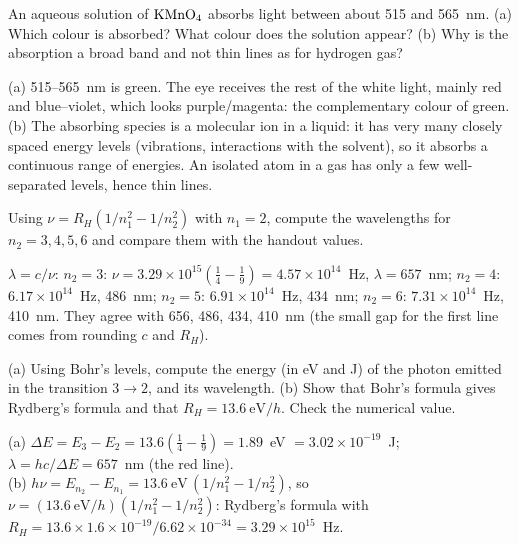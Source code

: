 An aqueous solution of $\ce{KMnO4}$ absorbs light between about 515 and 565~nm.
(a) Which colour is absorbed? What colour does the solution appear? (b) Why is the absorption a
broad band and not thin lines as for hydrogen gas?
\begin{solution}
(a) 515--565~nm is green. The eye receives the rest of the white light, mainly red and blue--violet,
which looks purple/magenta: the complementary colour of green.\\
(b) The absorbing species is a molecular ion in a liquid: it has very many closely spaced energy levels
(vibrations, interactions with the solvent), so it absorbs a continuous range of energies. An
isolated atom in a gas has only a few well-separated levels, hence thin lines.
\end{solution}

Using $\nu = R_H(1/n_1^2 - 1/n_2^2)$ with $n_1 = 2$, compute the wavelengths for $n_2 = 3, 4, 5, 6$
and compare them with the handout values.
\begin{solution}
$\lambda = c/\nu$:\quad
$n_2 = 3$: $\nu = 3.29\times10^{15}(\frac14-\frac19) = 4.57\times10^{14}$~Hz, $\lambda = 657$~nm;\quad
$n_2 = 4$: $6.17\times10^{14}$~Hz, 486~nm;\quad
$n_2 = 5$: $6.91\times10^{14}$~Hz, 434~nm;\quad
$n_2 = 6$: $7.31\times10^{14}$~Hz, 410~nm.
They agree with 656, 486, 434, 410~nm (the small gap for the first line comes from rounding $c$ and $R_H$).
\end{solution}

(a) Using Bohr's levels, compute the energy (in eV and J) of the photon emitted in the transition
$3\to2$, and its wavelength. (b) Show that Bohr's formula gives Rydberg's formula and that
$R_H = 13.6\ \mathrm{eV}/h$. Check the numerical value.
\begin{solution}
(a) $\Delta E = E_3 - E_2 = 13.6(\frac14 - \frac19) = 1.89$~eV $= 3.02\times10^{-19}$~J;
$\lambda = hc/\Delta E = 657$~nm (the red line).\\
(b) $h\nu = E_{n_2} - E_{n_1} = 13.6\ \mathrm{eV}\,(1/n_1^2 - 1/n_2^2)$, so
$\nu = (13.6\ \mathrm{eV}/h)(1/n_1^2 - 1/n_2^2)$: Rydberg's formula with
$R_H = 13.6\times1.6\times10^{-19}/6.62\times10^{-34} = 3.29\times10^{15}$~Hz. \checkmark
\end{solution}

